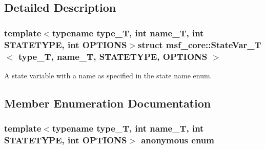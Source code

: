 \subsection{Detailed Description}
\subsubsection*{template$<$typename type\-\_\-\-T, int name\-\_\-\-T, int S\-T\-A\-T\-E\-T\-Y\-P\-E, int O\-P\-T\-I\-O\-N\-S$>$struct msf\-\_\-core\-::\-State\-Var\-\_\-\-T$<$ type\-\_\-\-T, name\-\_\-\-T, S\-T\-A\-T\-E\-T\-Y\-P\-E, O\-P\-T\-I\-O\-N\-S $>$}

A state variable with a name as specified in the state name enum. 

\subsection{Member Enumeration Documentation}
\hypertarget{structmsf__core_1_1StateVar__T_a4c4dbb9fb688dffcb86c1a2f5ea7ac3e}{\subsubsection[{anonymous enum}]{\setlength{\rightskip}{0pt plus 5cm}template$<$typename type\-\_\-\-T, int name\-\_\-\-T, int S\-T\-A\-T\-E\-T\-Y\-P\-E, int O\-P\-T\-I\-O\-N\-S$>$ anonymous enum}}\label{structmsf__core_1_1StateVar__T_a4c4dbb9fb688dffcb86c1a2f5ea7ac3e}
